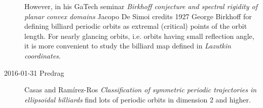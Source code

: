 \begin{description}
However, in his GaTech seminar {\em Birkhoff conjecture and spectral
rigidity of planar convex domains} Jacopo De Simoi credits
1927 George Birkhoff for defining billiard periodic orbits
as extremal (critical) points of the orbit length. For nearly glancing
orbits, i.e. orbits having small reflection angle, it is more convenient
to study the billiard map defined in {\em Lazutkin coordinates}.

    \item[2016-01-31 Predrag]                      \toCB
Casas and Ram{\'i}rez-Ros
{\em Classification of symmetric periodic trajectories in ellipsoidal billiards}
find lots of periodic orbits in dimension 2 and higher.



\end{description}
